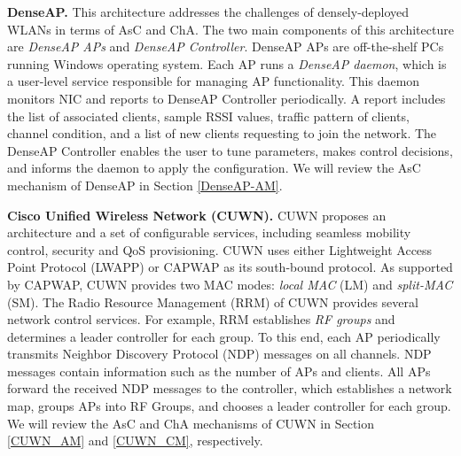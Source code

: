 \textbf{DenseAP. }
\label{DenseAP_arch}
This architecture \cite{DenseAP} addresses the challenges of densely-deployed WLANs in terms of AsC and ChA.
The two main components of this architecture are \textit{DenseAP APs} and \textit{DenseAP Controller}. 
DenseAP APs are off-the-shelf PCs running Windows operating system.
Each AP runs a \textit{DenseAP daemon}, which is a user-level service responsible for managing AP functionality.
This daemon monitors NIC and reports to DenseAP Controller periodically.
A report includes the list of associated clients, sample RSSI values, traffic pattern of clients, channel condition, and a list of new clients requesting to join the network. 
The DenseAP Controller enables the user to tune parameters, makes control decisions, and informs the daemon to apply the configuration.
We will review the AsC mechanism of DenseAP in Section \ref{DenseAP-AM}.



\textbf{Cisco Unified Wireless Network (CUWN). }
\label{CUWNarch}
%
%
%
%
CUWN \cite{Cisco} proposes an architecture and a set of configurable services, including seamless mobility control, security and QoS provisioning.
CUWN uses either Lightweight Access Point Protocol (LWAPP) \cite{LWAPP} or CAPWAP \cite{CAPWAP} as its south-bound protocol. 
As supported by CAPWAP, CUWN provides two MAC modes: \textit{local MAC} (LM) and \textit{split-MAC} (SM).
The Radio Resource Management (RRM) \cite{CiscoRRM} of CUWN provides several network control services.
For example, RRM establishes \textit{RF groups} and determines a leader controller for each group.
To this end, each AP periodically transmits Neighbor Discovery Protocol (NDP) messages on all channels.
NDP messages contain information such as the number of APs and clients.
All APs forward the received NDP messages to the controller, which establishes a network map, groups APs into RF Groups, and chooses a leader controller for each group. 
We will review the AsC and ChA mechanisms of CUWN in Section \ref{CUWN_AM} and \ref{CUWN_CM}, respectively.

